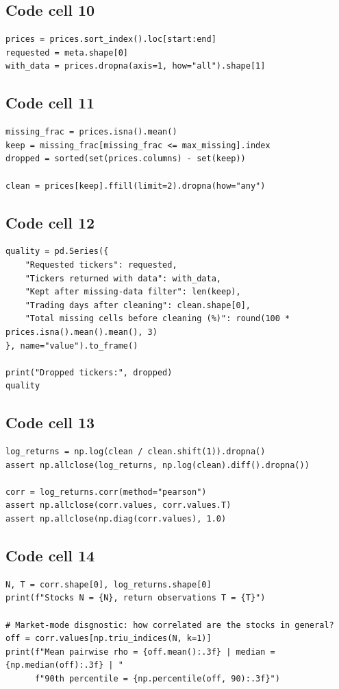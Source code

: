 \documentclass[12pt,a4paper]{report}
\begin{document}
\subsection*{Code cell 10}
\begin{lstlisting}[style=fancy]
prices = prices.sort_index().loc[start:end]
requested = meta.shape[0]
with_data = prices.dropna(axis=1, how="all").shape[1]
\end{lstlisting}

\subsection*{Code cell 11}
\begin{lstlisting}[style=fancy]
missing_frac = prices.isna().mean()
keep = missing_frac[missing_frac <= max_missing].index
dropped = sorted(set(prices.columns) - set(keep))

clean = prices[keep].ffill(limit=2).dropna(how="any")
\end{lstlisting}

\subsection*{Code cell 12}
\begin{lstlisting}[style=fancy]
quality = pd.Series({
    "Requested tickers": requested,
    "Tickers returned with data": with_data,
    "Kept after missing-data filter": len(keep),
    "Trading days after cleaning": clean.shape[0],
    "Total missing cells before cleaning (%)": round(100 * prices.isna().mean().mean(), 3)
}, name="value").to_frame()

print("Dropped tickers:", dropped)
quality
\end{lstlisting}

\subsection*{Code cell 13}
\begin{lstlisting}[style=fancy]
log_returns = np.log(clean / clean.shift(1)).dropna()
assert np.allclose(log_returns, np.log(clean).diff().dropna())

corr = log_returns.corr(method="pearson")
assert np.allclose(corr.values, corr.values.T)
assert np.allclose(np.diag(corr.values), 1.0)
\end{lstlisting}

\subsection*{Code cell 14}
\begin{lstlisting}[style=fancy]
N, T = corr.shape[0], log_returns.shape[0]
print(f"Stocks N = {N}, return observations T = {T}")

# Market-mode disgnostic: how correlated are the stocks in general?
off = corr.values[np.triu_indices(N, k=1)]
print(f"Mean pairwise rho = {off.mean():.3f} | median = {np.median(off):.3f} | "
      f"90th percentile = {np.percentile(off, 90):.3f}")
\end{lstlisting}
\end{document}
